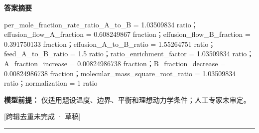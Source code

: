 \documentclass[UTF8,11pt,a4paper]{ctexart}
\begin{document}
\noindent\textbf{答案摘要}\par
per\_mole\_fraction\_rate\_ratio\_A\_to\_B = 1.03509834 ratio；effusion\_flow\_A\_fraction = 0.608249867 fraction；effusion\_flow\_B\_fraction = 0.391750133 fraction；effusion\_A\_to\_B\_ratio = 1.55264751 ratio；feed\_A\_to\_B\_ratio = 1.5 ratio；ratio\_enrichment\_factor = 1.03509834 ratio；A\_fraction\_increase = 0.00824986738 fraction；B\_fraction\_decrease = 0.00824986738 fraction；molecular\_mass\_square\_root\_ratio = 1.03509834 ratio；normalization = 1 ratio\par
\noindent\textbf{模型前提：}
仅适用题设温度、边界、平衡和理想动力学条件；人工专家未审定。\par
\noindent\textcolor{red!65!black}{[跨辑去重未完成 · 草稿]} \par
\medskip\hrule\medskip
{}
\end{document}
